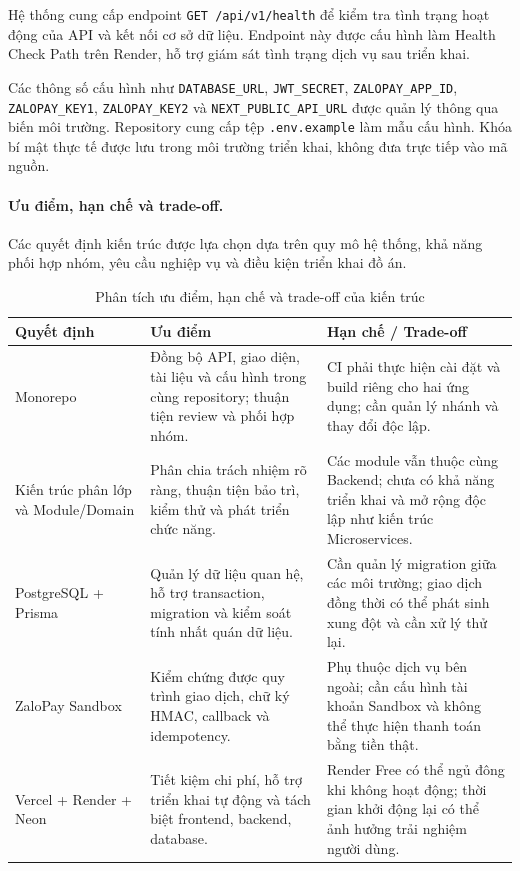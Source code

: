 Hệ thống cung cấp endpoint \texttt{GET /api/v1/health} để kiểm tra tình trạng hoạt động của API và kết nối cơ sở dữ liệu. Endpoint này được cấu hình làm Health Check Path trên Render, hỗ trợ giám sát tình trạng dịch vụ sau triển khai.

Các thông số cấu hình như \texttt{DATABASE\_URL}, \texttt{JWT\_SECRET}, \texttt{ZALOPAY\_APP\_ID}, \texttt{ZALOPAY\_KEY1}, \texttt{ZALOPAY\_KEY2} và \texttt{NEXT\_PUBLIC\_API\_URL} được quản lý thông qua biến môi trường. Repository cung cấp tệp \texttt{.env.example} làm mẫu cấu hình. Khóa bí mật thực tế được lưu trong môi trường triển khai, không đưa trực tiếp vào mã nguồn.

\paragraph{Ưu điểm, hạn chế và trade-off.}

Các quyết định kiến trúc được lựa chọn dựa trên quy mô hệ thống, khả năng phối hợp nhóm, yêu cầu nghiệp vụ và điều kiện triển khai đồ án.

\begin{table}[H]
\centering
\small
\caption{Phân tích ưu điểm, hạn chế và trade-off của kiến trúc}
\label{tabB:tradeoff}
\begin{tabularx}{\textwidth}{@{}p{3cm} X X@{}}
\toprule
\textbf{Quyết định} &
\textbf{Ưu điểm} &
\textbf{Hạn chế / Trade-off} \\
\midrule

Monorepo &
Đồng bộ API, giao diện, tài liệu và cấu hình trong cùng repository; thuận tiện review và phối hợp nhóm. &
CI phải thực hiện cài đặt và build riêng cho hai ứng dụng; cần quản lý nhánh và thay đổi độc lập. \\

Kiến trúc phân lớp và Module/Domain &
Phân chia trách nhiệm rõ ràng, thuận tiện bảo trì, kiểm thử và phát triển chức năng. &
Các module vẫn thuộc cùng Backend; chưa có khả năng triển khai và mở rộng độc lập như kiến trúc Microservices. \\

PostgreSQL + Prisma &
Quản lý dữ liệu quan hệ, hỗ trợ transaction, migration và kiểm soát tính nhất quán dữ liệu. &
Cần quản lý migration giữa các môi trường; giao dịch đồng thời có thể phát sinh xung đột và cần xử lý thử lại. \\

ZaloPay Sandbox &
Kiểm chứng được quy trình giao dịch, chữ ký HMAC, callback và idempotency. &
Phụ thuộc dịch vụ bên ngoài; cần cấu hình tài khoản Sandbox và không thể thực hiện thanh toán bằng tiền thật. \\

Vercel + Render + Neon &
Tiết kiệm chi phí, hỗ trợ triển khai tự động và tách biệt frontend, backend, database. &
Render Free có thể ngủ đông khi không hoạt động; thời gian khởi động lại có thể ảnh hưởng trải nghiệm người dùng. \\
\bottomrule
\end{tabularx}
\end{table}

